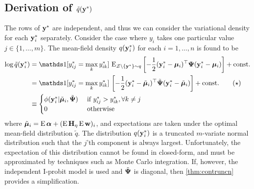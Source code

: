 \subsection{Derivation of \texorpdfstring{$\tilde q({\mathbf y}^*)$}{$\tilde q(y^*)$}}

The rows of ${\mathbf y}^*$ are independent, and thus we can consider the variational density for each ${\mathbf y}_i^*$ separately.
Consider the case where $y_i$ takes one particular value $j \in \{1,\dots,m\}$. The mean-field density $q({\mathbf y}_{i}^*)$ for each $i=1,\dots,n$ is found to be
\begin{align*}
  \log \tilde q(\by_{i}^*) 
  &=  \ind[y_{ij}^* = \max_k y_{ik}^*] \, \E_{\cZ\backslash\{\by^*\}\sim q} \left[ - \half (\by^*_i - \bmu_i)^\top \bPsi (\by^*_i - \bmu_i)  \right] + \const \\
  &= \ind[y_{ij}^* = \max_k y_{ik}^*] \, \left[ - \half (\by^*_i - \tilde\bmu_i)^\top \tilde\bPsi (\by^*_i - \tilde\bmu_i)  \right] + \const \tag{$\star$} \\
  &\equiv
  \begin{cases}
    \phi(\by_i^*|\tilde\bmu_i,\tilde\bPsi) & \text{ if } y_{ij}^* > y_{ik}^*, \forall k \neq j \\
    0 & \text{ otherwise} \\
  \end{cases}
\end{align*}
where $\tilde{{\bm\mu}}_i = \operatorname{E}{\bm\alpha} + (\operatorname{E}{\mathbf H}_\eta \operatorname{E}{\mathbf w})_i$, and expectations are taken under the optimal mean-field distribution $\tilde q$. 
The distribution $q({\mathbf y}_i^*)$ is a truncated $m$-variate normal distribution such that the $j$'th component is always largest. 
Unfortunately, the expectation of this distribution cannot be found in closed-form, and must be approximated by techniques such as Monte Carlo integration.
If, however, the independent I-probit model is used and $\tilde{{\bm\Psi}}$ is diagonal, then \cref{thm:contruncn} provides a simplification.

